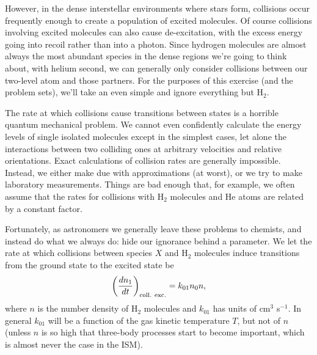 However, in the dense interstellar environments where stars form, collisions occur frequently enough to create a population of excited molecules. Of course collisions involving excited molecules can also cause de-excitation, with the excess energy going into recoil rather than into a photon. Since hydrogen molecules are almost always the most abundant species in the dense regions we're going to think about, with helium second, we can generally only consider collisions between our two-level atom and those partners. For the purposes of this exercise (and the problem sets), we'll take an even simple and ignore everything but H$_2$.

The rate at which collisions cause transitions between states is a horrible quantum mechanical problem. We cannot even confidently calculate the energy levels of single isolated molecules except in the simplest cases, let alone the interactions between two colliding ones at arbitrary velocities and relative orientations. Exact calculations of collision rates are generally impossible. Instead, we either make due with approximations (at worst), or we try to make laboratory measurements. Things are bad enough that, for example, we often assume that the rates for collisions with H$_2$ molecules and He atoms are related by a constant factor.

Fortunately, as astronomers we generally leave these problems to chemists, and instead do what we always do: hide our ignorance behind a parameter. We let the rate at which collisions between species $X$ and H$_2$ molecules induce transitions from the ground state to the excited state be
\begin{equation}
\left(\frac{dn_1}{dt}\right)_{\rm coll.~exc.} = k_{01} n_0 n,
\end{equation}
where $n$ is the number density of H$_2$ molecules and $k_{01}$ has units of cm$^3$ s$^{-1}$. In general $k_{01}$ will be a function of the gas kinetic temperature $T$, but not of $n$ (unless $n$ is so high that three-body processes start to become important, which is almost never the case in the ISM). 

